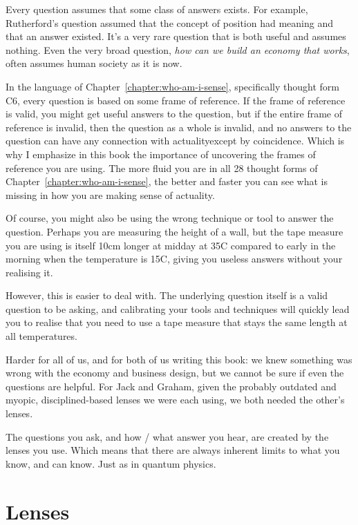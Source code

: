 Every question assumes that some class of answers exists. For example, Rutherford's question assumed that the concept of position had meaning and that an answer existed. It's a very rare question that is both useful and assumes nothing. Even the very broad question, \emph{how can we build an economy that works}, often assumes human society as it is now.


In the language of Chapter~\ref{chapter:who-am-i-sense}, specifically thought form C6, every question is based on some frame of reference. If the frame of reference is valid, you might get useful answers to the question, but if the entire frame of reference is invalid, then the question as a whole is invalid, and no answers to the question can have any connection with actuality\textemdash except by coincidence. Which is why I emphasize in this book the importance of uncovering the frames of reference you are using. The more fluid you are in all 28 thought forms of Chapter~\ref{chapter:who-am-i-sense}, the better and faster you can see what is missing in how you are making sense of actuality.


Of course, you might also be using the wrong technique or tool to answer the question. Perhaps you are measuring the height of a wall, but the tape measure you are using is itself 10cm longer at midday at 35\textdegree{}C compared to early in the morning when the temperature is 15\textdegree{}C, giving you useless answers without your realising it. 


However, this is easier to deal with. The underlying question itself is a valid question to be asking, and calibrating your tools and techniques will quickly lead you to realise that you need to use a tape measure that stays the same length at all temperatures.


Harder for all of us, and for both of us writing this book: we knew something was wrong with the economy and business design, but we cannot be sure if even the questions are helpful. For Jack and Graham, given the probably outdated and myopic, disciplined-based lenses we were each using, we both needed the other’s lenses. 


The questions you ask, and how / what answer you hear, are created by the lenses you use. Which means that there are always inherent limits to what you know, and can know. Just as in quantum physics.




\section{Lenses}


